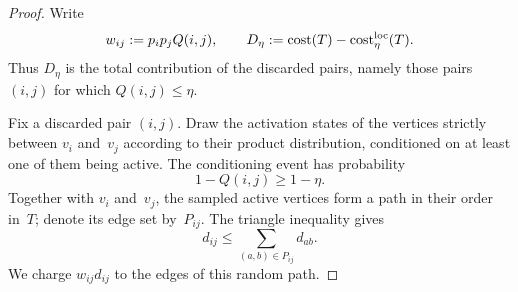 \documentclass[12pt,a4paper,oneside]{report}
\begin{document}
\begin{proof}
Write
\[
    w_{ij}:=p_ip_jQ(i,j),
    \qquad
    D_\eta:=\operatorname{cost}(T)-\operatorname{cost}^{\operatorname{loc}}_{\eta}(T).
\]
Thus $D_\eta$ is the total contribution of the discarded pairs, namely those
pairs $(i,j)$ for which $Q(i,j)\le\eta$.

Fix a discarded pair $(i,j)$.  Draw the activation states of the vertices
strictly between $v_i$ and~$v_j$ according to their product distribution,
conditioned on at least one of them being active.  The conditioning event has
probability
\[
    1-Q(i,j)\ge1-\eta.
\]
Together with $v_i$ and~$v_j$, the sampled active vertices form a path in
their order in~$T$; denote its edge set by~$P_{ij}$.  The triangle inequality
gives
\[
    d_{ij}\le\sum_{(a,b)\in P_{ij}}d_{ab}.
\]
We charge $w_{ij}d_{ij}$ to the edges of this random path.


\end{proof}
\end{document}

